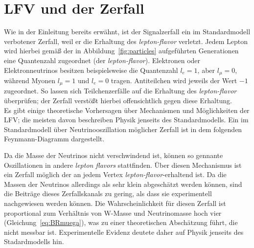 \section{\texorpdfstring{LFV und der Zerfall \signal}{Jpsi to eµ}}
%
Wie in der Einleitung bereits erwähnt, ist der Signalzerfall \signal ein im Standardmodell verbotener Zerfall, weil er die Erhaltung des \textit{lepton-flavor} verletzt. Jedem Lepton wird hierbei gemäß der in Abbildung~\ref{fig:particles} aufgeführten Generationen eine Quantenzahl zugeordnet (der \textit{lepton-flavor}). Elektronen oder Elektronneutrinos besitzen beispielsweise die Quantenzahl $l_e=1$, aber $l_\mu=0$, während Myonen $l_\mu=1$ und $l_e=0$ tragen. Antiteilchen wird jeweils der Wert $-1$ zugeordnet. So lassen sich Teilchenzerfälle auf die Erhaltung des \textit{lepton-flavor} überprüfen; der Zerfall \signal verstößt hierbei offensichtlich gegen diese Erhaltung.\\
%
Es gibt einige theoretische Vorhersagen über Mechanismen und Möglichkeiten der LFV; die meisten davon beschreiben Physik jenseits des Standardmodells. Ein im Standardmodell über Neutrinooszillation möglicher Zerfall ist in dem folgenden Feynmann-Diagramm dargestellt.
%
\begin{figure}[H]
  \centering
  \label{fig:lfv_nu}
\end{figure}
%
Da die Masse der Neutrinos nicht verschwindend ist, können so gennante Oszillationen in andere \textit{lepton flavors} stattfinden. Über diesen Mechanismus ist ein Zerfall möglich der an jedem Vertex \textit{lepton-flavor}-erhaltend ist. Da die Massen der Neutrinos allerdings als sehr klein abgeschätzt werden können, sind die Beiträge dieses Zerfallskanals zu gering, als dass sie experimentell nachgewiesen werden können. Die Wahrscheinlichkeit für diesen Zerfall ist proportional zum Verhältnis von W-Masse und Neutrinomasse hoch vier (Gleichung~\ref{eq:BRmuega}), was zu einer theoretischen Abschätzung führt, die nicht messbar ist. Experimentelle Evidenz deutete daher auf Physik jenseits des Stadardmodells hin.
